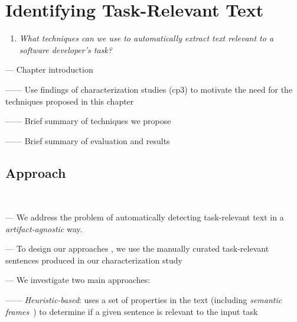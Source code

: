 \setcounter{chapter}{3}
\setcounter{rq}{1}


\chapter{Identifying Task-Relevant Text}
\label{ch:identifying}



\vspace{1mm}

\begin{enumerate}[label=\textit{RQ\arabic*},leftmargin=1.4cm]

\item \textit{What techniques can we use to automatically extract text relevant to a software developer's task?} 

\end{enumerate}

\vspace{1mm}

--- Chapter introduction 

------ Use findings of characterization studies (cp3) to motivate the need for the techniques proposed in this chapter

------ Brief summary of techniques we propose

------ Brief summary of evaluation and results



\clearpage


\section{Approach}
\textcolor{white}{force ident} %

--- We address  the problem of automatically detecting task-relevant text in a \textit{artifact-agnostic} way. \vspace{3mm}

--- To design our approaches , we use the manually curated task-relevant sentences produced in our characterization study~\cite{marques2020} \vspace{3mm}

--- We investigate two main approaches:

------ \textit{Heuristic-based}: uses a set of properties in the text (including \textit{semantic frames}~\cite{fillmore1976frame}) to determine if a given sentence is relevant to the input task

